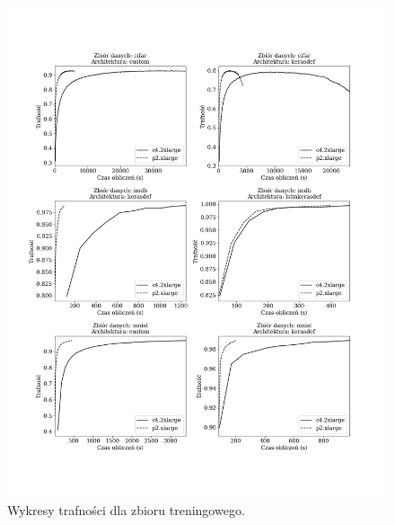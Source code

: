 \documentclass[12pt,a4paper,twoside]{article}
\begin{document}
\begin{figure}[h]
  \centering
\includegraphics[scale=0.5]{../obrazy/fig:experiment_acc.png}
\caption{Wykresy trafności dla zbioru treningowego.\label{fig:experiment_acc}}
\end{figure}
\end{document}
